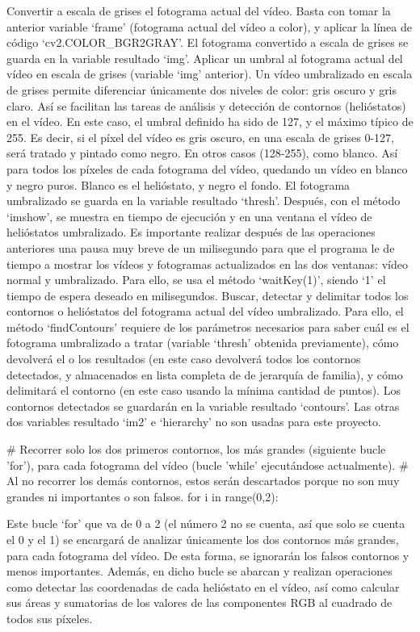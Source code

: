 \documentclass[12pt]{article}
\begin{document}
Convertir a escala de grises el fotograma actual del vídeo. Basta con tomar la anterior variable ‘frame’ (fotograma actual del vídeo a color), y aplicar la línea de código ‘cv2.COLOR\_BGR2GRAY’. El fotograma convertido a escala de grises se guarda en la variable resultado ‘img’.
Aplicar un umbral al fotograma actual del vídeo en escala de grises (variable ‘img’ anterior). Un vídeo umbralizado en escala de grises permite diferenciar únicamente dos niveles de color: gris oscuro y gris claro. Así se facilitan las tareas de análisis y detección de contornos (helióstatos) en el vídeo. En este caso, el umbral definido ha sido de 127, y el máximo típico de 255. Es decir, si el píxel del vídeo es gris oscuro, en una escala de grises 0-127, será tratado y pintado como negro. En otros casos (128-255), como blanco. Así para todos los píxeles de cada fotograma del vídeo, quedando un vídeo en blanco y negro puros. Blanco es el helióstato, y negro el fondo. El fotograma umbralizado se guarda en la variable resultado ‘thresh’. Después, con el método ‘imshow’, se muestra en tiempo de ejecución y en una ventana el vídeo de helióstatos umbralizado. Es importante realizar después de las operaciones anteriores una pausa muy breve de un milisegundo para que el programa le de tiempo a mostrar los vídeos y fotogramas actualizados en las dos ventanas: vídeo normal y umbralizado. Para ello, se usa el método ‘waitKey(1)’, siendo ‘1’ el tiempo de espera deseado en milisegundos.
Buscar, detectar y delimitar todos los contornos o helióstatos del fotograma actual del vídeo umbralizado. Para ello, el método ‘findContours’ requiere de los parámetros necesarios para saber cuál es el fotograma umbralizado a tratar (variable ‘thresh’ obtenida previamente), cómo devolverá el o los resultados (en este caso devolverá todos los contornos detectados, y almacenados en lista completa de de jerarquía de familia), y cómo delimitará el contorno (en este caso usando la mínima cantidad de puntos). Los contornos detectados se guardarán en la variable resultado ‘contours’. Las otras dos variables resultado ‘im2’ e ‘hierarchy’ no son usadas para este proyecto.
        

    \# Recorrer solo los dos primeros contornos, los más grandes (siguiente bucle 'for'), para cada fotograma del vídeo (bucle 'while' ejecutándose actualmente).
    \# Al no recorrer los demás contornos, estos serán descartados porque no son muy grandes ni importantes o son falsos.
    for i in range(0,2):

Este bucle ‘for’ que va de 0 a 2 (el número 2 no se cuenta, así que solo se cuenta el 0 y el 1) se encargará de analizar únicamente los dos contornos más grandes, para cada fotograma del vídeo. De esta forma, se ignorarán los falsos contornos y menos importantes. Además, en dicho bucle se abarcan y realizan operaciones como detectar las coordenadas de cada helióstato en el vídeo, así como calcular sus áreas y sumatorias de los valores de las componentes RGB al cuadrado de todos sus píxeles.
        
\end{document}
